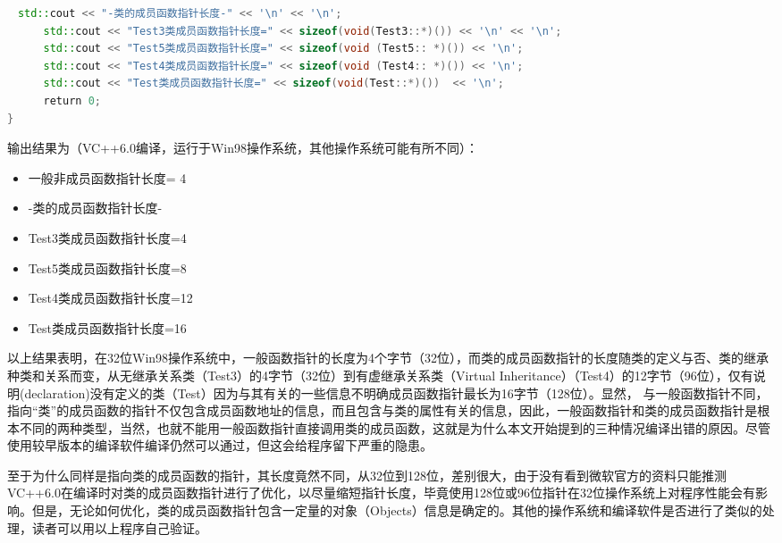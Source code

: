 \documentclass{article}
\begin{document}
\begin{CJK}{UTF8}{gbsn}
\begin{itemize}
\begin{lstlisting}[language=c++]
    　std::cout << "-类的成员函数指针长度-" << '\n' << '\n';  
    　std::cout << "Test3类成员函数指针长度=" << sizeof(void(Test3::*)()) << '\n' << '\n';  
    　std::cout << "Test5类成员函数指针长度=" << sizeof(void (Test5:: *)()) << '\n';  
    　std::cout << "Test4类成员函数指针长度=" << sizeof(void (Test4:: *)()) << '\n';  
    　std::cout << "Test类成员函数指针长度=" << sizeof(void(Test::*)())  << '\n';  
    　return 0;  
} 
\end{lstlisting}
输出结果为（VC++6.0编译，运行于Win98操作系统，其他操作系统可能有所不同）：
\begin{itemize}
  \itemsep=-3pt
\item 一般非成员函数指针长度= 4
\item -类的成员函数指针长度-
\item Test3类成员函数指针长度=4
\item Test5类成员函数指针长度=8
\item Test4类成员函数指针长度=12
\item Test类成员函数指针长度=16
\end{itemize}
以上结果表明，在32位Win98操作系统中，一般函数指针的长度为4个字节（32位），而类的成员函数指针的长度随类的定义与否、类的继承种类和关系而变，从无继承关系类（Test3）的4字节（32位）到有虚继承关系类（Virtual Inheritance）（Test4）的12字节（96位），仅有说明(declaration)没有定义的类（Test）因为与其有关的一些信息不明确成员函数指针最长为16字节（128位）。显然， 与一般函数指针不同，指向“类”的成员函数的指针不仅包含成员函数地址的信息，而且包含与类的属性有关的信息，因此，一般函数指针和类的成员函数指针是根本不同的两种类型，当然，也就不能用一般函数指针直接调用类的成员函数，这就是为什么本文开始提到的三种情况编译出错的原因。尽管使用较早版本的编译软件编译仍然可以通过，但这会给程序留下严重的隐患。

至于为什么同样是指向类的成员函数的指针，其长度竟然不同，从32位到128位，差别很大，由于没有看到微软官方的资料只能推测VC++6.0在编译时对类的成员函数指针进行了优化，以尽量缩短指针长度，毕竟使用128位或96位指针在32位操作系统上对程序性能会有影响。但是，无论如何优化，类的成员函数指针包含一定量的对象（Objects）信息是确定的。其他的操作系统和编译软件是否进行了类似的处理，读者可以用以上程序自己验证。


\end{itemize}
\end{CJK}
\end{document}
